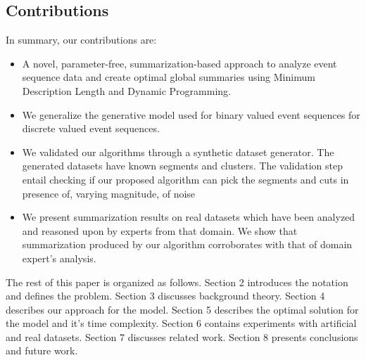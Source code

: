 \subsection{Contributions}
In summary, our contributions are: 
\begin{itemize}
\item A novel, parameter-free, summarization-based approach to analyze event sequence data and create optimal global summaries using Minimum Description Length and Dynamic Programming. 
\item We generalize the generative model used for binary valued event sequences for discrete valued event sequences.
\item We validated our algorithms through a synthetic dataset generator. The generated datasets have known segments and clusters. The validation step entail checking if our proposed algorithm can pick the segments and cuts in presence of, varying magnitude, of  noise
  
\item  We present summarization results  on  real datasets which have been analyzed and reasoned upon by experts from that domain. We show that summarization produced by our algorithm corroborates with that of domain expert's analysis.

 

\end{itemize}
The rest of this paper is organized as follows. Section 2 introduces the notation and defines the problem. Section 3 discusses background theory. Section 4 describes our approach for the model. Section 5 describes the optimal solution for the model and it's time complexity. Section 6 contains experiments with artificial and real datasets. Section 7 discusses related work. Section 8 presents conclusions and future work.





